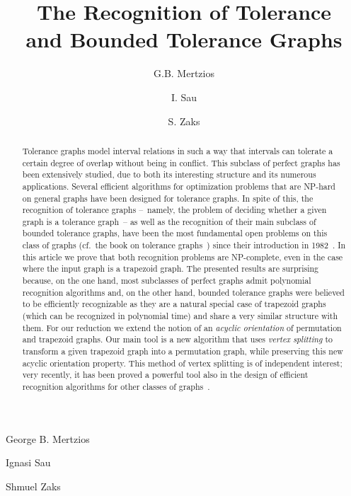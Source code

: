 \documentclass[proceedings]{stacs}
\begin{document}
\title[The Recognition of Tolerance and Bounded Tolerance Graphs]{The Recognition of Tolerance \\
and Bounded Tolerance Graphs}

\author[lab1]{G.B. Mertzios}{George B. Mertzios}
\address[lab1]{Department of Computer Science, RWTH Aachen University, Aachen, Germany}  

\author[lab2]{I. Sau}{Ignasi Sau}
\address[lab2]{Department of Computer Science, Technion, Haifa, Israel}	

\author[lab3]{S. Zaks}{Shmuel Zaks}
\address[lab3]{Department of Computer Science, Technion, Haifa, Israel}	




\begin{abstract}
Tolerance graphs model interval relations in such a way that intervals can
tolerate a certain degree of overlap without being in conflict. This subclass
of perfect graphs has been extensively studied, due to both its interesting
structure and its numerous applications. Several efficient algorithms for optimization
problems that are NP-hard on general graphs have been designed for tolerance
graphs. In spite of this, the recognition of tolerance graphs --~namely, the problem of 
deciding whether a given graph is a tolerance graph~-- 
as well as the recognition of their main subclass of bounded tolerance graphs, 
have been the most fundamental open problems on this class of graphs (cf.~the book on
tolerance graphs~\cite{GolTol04}) since their introduction in 1982~\cite{GoMo82}. 
In this article we prove that both recognition problems are NP-complete, 
even in the case where the input graph is a trapezoid graph. 
The presented results are surprising because, on the one hand, most subclasses of perfect graphs 
admit polynomial recognition algorithms 
and, on the other hand, bounded tolerance graphs were believed to be efficiently recognizable as 
they are a natural special case of trapezoid graphs (which can be recognized in polynomial time) 
and share a very similar structure with them. 
For our reduction we extend the notion of an \emph{acyclic orientation} of permutation and trapezoid graphs. 
Our main tool is a new algorithm that uses \emph{vertex splitting} to transform a given trapezoid graph 
into a permutation graph, while preserving this new acyclic orientation property. 
This method of vertex splitting is of independent interest; very recently, it has been proved a 
powerful tool also in the design of efficient recognition algorithms for other classes of graphs~\cite{MC-Trapezoid}.

\end{abstract}
\maketitle
\end{document}
